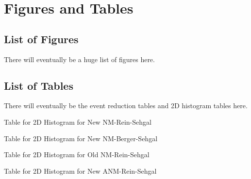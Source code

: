 \documentclass[11pt]{article}
\begin{document}
\section{Figures and Tables} \label{sec:FigTab}
\subsection{List of Figures}
There will eventually be a huge list of figures here.

\subsection{List of Tables}
There will eventually be the event reduction tables and 2D histogram tables here.

\newpage
\begin{landscape}
\begin{table}
\centering
\caption{Table for 2D Histogram for New NM-Rein-Sehgal}
\begin{adjustbox}{width=\paperwidth}
\end{adjustbox}
\end{table}
\end{landscape}

\newpage
\begin{landscape}
\begin{table}
\centering
\caption{Table for 2D Histogram for New NM-Berger-Sehgal}
\begin{adjustbox}{width=\paperwidth}
\end{adjustbox}
\end{table}
\end{landscape}

\newpage
\begin{landscape}
\begin{table}
\centering
\caption{Table for 2D Histogram for Old NM-Rein-Sehgal}
\begin{adjustbox}{width=\paperwidth}
\end{adjustbox}
\end{table}
\end{landscape}

\newpage
\begin{landscape}
\begin{table}
\centering
\caption{Table for 2D Histogram for New ANM-Rein-Sehgal}
\begin{adjustbox}{width=\paperwidth}
\end{adjustbox}
\end{table}
\end{landscape}
\end{document}
